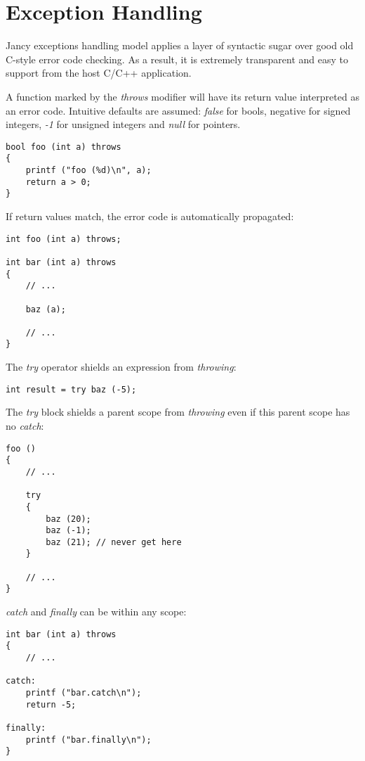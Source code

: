 \documentclass[oneside]{book}
\begin{document}
\section{Exception Handling}

Jancy exceptions handling model applies a layer of syntactic sugar over good old C-style error code checking. As a result, it is extremely transparent and easy to support from the host C/C++ application.

A function marked by the \emph{throws} modifier will have its return value interpreted as an error code. Intuitive defaults are assumed: \emph{false} for bools, negative for signed integers, \emph{-1} for unsigned integers and \emph{null} for pointers.

\begin{lstlisting}
bool foo (int a) throws
{
    printf ("foo (%d)\n", a);
    return a > 0;
}
\end{lstlisting}

If return values match, the error code is automatically propagated:

\begin{lstlisting}
int foo (int a) throws;

int bar (int a) throws
{
    // ...

    baz (a); 

    // ...
}
\end{lstlisting}

The \emph{try} operator shields an expression from \emph{throwing}:

\begin{lstlisting}
int result = try baz (-5);
\end{lstlisting}

The \emph{try} block shields a parent scope from \emph{throwing} even if this parent scope has no \emph{catch}:

\begin{lstlisting}
foo ()
{
    // ...

    try
    {
        baz (20);
        baz (-1);
        baz (21); // never get here 
    }

    // ...
}
\end{lstlisting}

\emph{catch} and \emph{finally} can be within any scope:

\begin{lstlisting}
int bar (int a) throws
{
    // ...

catch: 
    printf ("bar.catch\n"); 
    return -5;

finally:
    printf ("bar.finally\n");   
}
\end{lstlisting}
\end{document}
